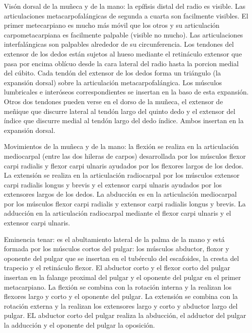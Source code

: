 \documentclass[a4paper,12pt]{article} %
\begin{document}
Visón dorsal de la muñeca y de la mano: la epífisis distal del radio es visible. Las articulaciones metacarpofalángicas de segunda a cuarta son facilmente visibles. El primer metecarpiano es mucho más móvil que los otros y su articulación carpometacarpiana es facilmente palpable (visible no mucho). Las articulaciones interfalángicas son palpables alrededor de su circunferencia.
Los tendones del extensor de los dedos están sujetos al hueso mediante el retináculo extensor que pasa por encima oblícuo desde la cara lateral del radio hasta la porcion medial del cúbito. Cada tendón del extensor de los dedos forma un triángulo (la expansión dorsal) sobre la articulación metacarpofalángica. Los músculos lumbricales e interóseos correspondientes se insertan en la baso de esta expansión. Otros dos tendones pueden verse en el dorso de la muñeca, el extensor de meñique que discurre lateral al tendón largo del quinto dedo y el extensor del índice que discurre medial al tendón largo del dedo índice. Ambos insertan en la expansión dorsal.

Movimientos de la muñeca y de la mano: la flexión se realiza en la articulación mediocarpal (entre las dos hileras de carpos) desarrollada por los músculos flexor carpi radialis y flexor carpi ulnaris ayudados por los flexores largos de los dedos. La extensión se realiza en la articulación radiocarpal por los músculos extensor carpi radialis longus y brevis y el extensor carpi ulnaris ayudados por los extensores largos de los dedos. La abducción es en la articulación mediocarpal por los músculos flexor carpi radialis y extensor carpi radialis longus y brevis. La adducción en la articulación radiocarpal mediante el flexor carpi ulnaris y el extensor carpi ulnaris.

Eminencia tenar: es el abultamiento lateral de la palma de la mano y está formada por los músculos cortos del pulgar: los músculos abductor, floxor y oponente del pulgar que se insertan en el tubérculo del escafoides, la cresta del trapecio y el retináculo flexor. El abductor corto y el flexor corto del pulgar insertan en la falange proximal del pulgar y el oponente del pulgar en el primer metacarpiano.
La flexión se combina con la rotación interna y la realizan los flexores largo y corto y el oponente del pulgar. La extensión se combina con la rotación externa y la realizan los extensores largo y corto y abductor largo del pulgar. EL abductor corto del pulgar realiza la abducción, el adductor del pulgar la adducción y el oponente del pulgar la oposición.
\end{document}
